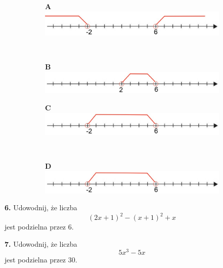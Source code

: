 \documentclass[12pt,a4paper]{article}
\theoremstyle{break}
\begin{document}
\begin{figure}[h]
	\centering
	\begin{subfigure}[b]{0.45\textwidth}
		\Large \textbf{A}
		\includegraphics[width=\textwidth]{z1_2_1.jpeg}
		
	\end{subfigure}$\quad$
	\begin{subfigure}[b]{0.45\textwidth}
		\Large \textbf{B}
		\includegraphics[width=\textwidth]{z1_2_2.jpeg}
		
	\end{subfigure}
\end{figure}
\begin{figure}[h]
	\centering
	\begin{subfigure}[b]{0.45\textwidth}
		\Large \textbf{C}
		\includegraphics[width=\textwidth]{z1_2_3.jpeg}
		
	\end{subfigure}$\quad$
	\begin{subfigure}[b]{0.45\textwidth}
		\Large \textbf{D}
		\includegraphics[width=\textwidth]{z1_2_3.jpeg}
	\end{subfigure}
\end{figure}

\begin{mdframed}[style=zad]
	\vspace{0.2cm}
	\textbf{6.} Udowodnij, że liczba $$(2x+1)^2-(x+1)^2+x$$ jest podzielna przez 6. 
\end{mdframed}

\begin{mdframed}[style=zad]
	\vspace{0.2cm}
	\textbf{7.} Udowodnij, że liczba $$5x^3-5x$$ jest podzielna przez 30. 
\end{mdframed} 
\end{document}
